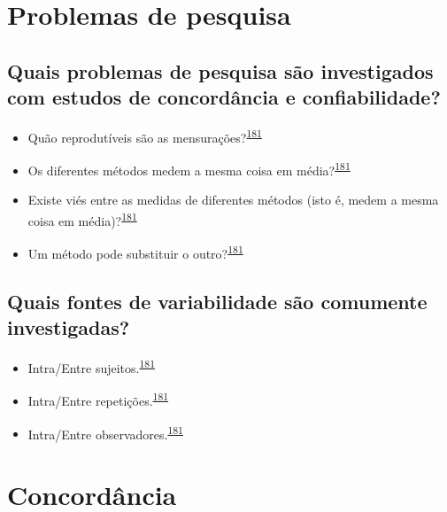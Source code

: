 \documentclass[
  a4paper,
]{book}
\begin{document}
\hypertarget{problemas}{%
\section{Problemas de pesquisa}\label{problemas}}

\hypertarget{quais-problemas-de-pesquisa-suxe3o-investigados-com-estudos-de-concorduxe2ncia-e-confiabilidade}{%
\subsection{Quais problemas de pesquisa são investigados com estudos de concordância e confiabilidade?}\label{quais-problemas-de-pesquisa-suxe3o-investigados-com-estudos-de-concorduxe2ncia-e-confiabilidade}}

\begin{itemize}
\item
  Quão reprodutíveis são as mensurações?\textsuperscript{\protect\hyperlink{ref-altman1983}{181}}
\item
  Os diferentes métodos medem a mesma coisa em média?\textsuperscript{\protect\hyperlink{ref-altman1983}{181}}
\item
  Existe viés entre as medidas de diferentes métodos (isto é, medem a mesma coisa em média)?\textsuperscript{\protect\hyperlink{ref-altman1983}{181}}
\item
  Um método pode substituir o outro?\textsuperscript{\protect\hyperlink{ref-altman1983}{181}}
\end{itemize}

\hypertarget{quais-fontes-de-variabilidade-suxe3o-comumente-investigadas}{%
\subsection{Quais fontes de variabilidade são comumente investigadas?}\label{quais-fontes-de-variabilidade-suxe3o-comumente-investigadas}}

\begin{itemize}
\item
  Intra/Entre sujeitos.\textsuperscript{\protect\hyperlink{ref-altman1983}{181}}
\item
  Intra/Entre repetições.\textsuperscript{\protect\hyperlink{ref-altman1983}{181}}
\item
  Intra/Entre observadores.\textsuperscript{\protect\hyperlink{ref-altman1983}{181}}
\end{itemize}

\hypertarget{concordancia}{%
\section{Concordância}\label{concordancia}}
\end{document}
